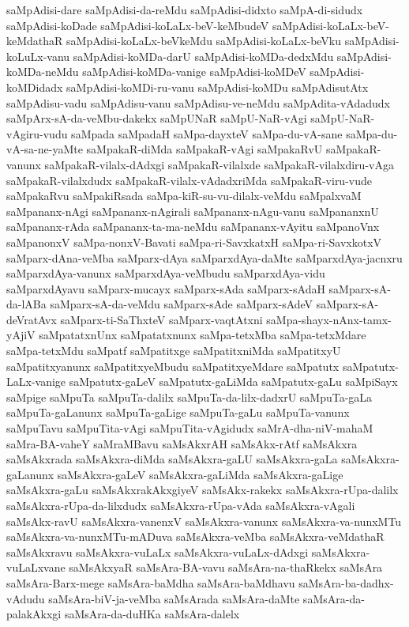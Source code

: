 {saMpAdisi-dare
saMpAdisi-da-reMdu
saMpAdisi-didxto
saMpA-di-sidudx
saMpAdisi-koDade
saMpAdisi-koLaLx-beV-keMbudeV
saMpAdisi-koLaLx-beV-keMdathaR
saMpAdisi-koLaLx-beVkeMdu
saMpAdisi-koLaLx-beVku
saMpAdisi-koLuLx-vanu
saMpAdisi-koMDa-darU
saMpAdisi-koMDa-dedxMdu
saMpAdisi-koMDa-neMdu
saMpAdisi-koMDa-vanige
saMpAdisi-koMDeV
saMpAdisi-koMDidadx
saMpAdisi-koMDi-ru-vanu
saMpAdisi-koMDu
saMpAdisutAtx
saMpAdisu-vadu
saMpAdisu-vanu
saMpAdisu-ve-neMdu
saMpAdita-vAdadudx
saMpArx-sA-da-veMbu-dakekx
saMpUNaR
saMpU-NaR-vAgi
saMpU-NaR-vAgiru-vudu
saMpada
saMpadaH
saMpa-dayxteV
saMpa-du-vA-sane
saMpa-du-vA-sa-ne-yaMte
saMpakaR-diMda
saMpakaR-vAgi
saMpakaRvU
saMpakaR-vanunx
saMpakaR-vilalx-dAdxgi
saMpakaR-vilalxde
saMpakaR-vilalxdiru-vAga
saMpakaR-vilalxdudx
saMpakaR-vilalx-vAdadxriMda
saMpakaR-viru-vude
saMpakaRvu
saMpakiRsada
saMpa-kiR-su-vu-dilalx-veMdu
saMpalxvaM
saMpananx-nAgi
saMpananx-nAgirali
saMpananx-nAgu-vanu
saMpananxnU
saMpananx-rAda
saMpananx-ta-ma-neMdu
saMpananx-vAyitu
saMpanoVnx
saMpanonxV
saMpa-nonxV-Bavati
saMpa-ri-SavxkatxH
saMpa-ri-SavxkotxV
saMparx-dAna-veMba
saMparx-dAya
saMparxdAya-daMte
saMparxdAya-jacnxru
saMparxdAya-vanunx
saMparxdAya-veMbudu
saMparxdAya-vidu
saMparxdAyavu
saMparx-mucayx
saMparx-sAda
saMparx-sAdaH
saMparx-sA-da-lABa
saMparx-sA-da-veMdu
saMparx-sAde
saMparx-sAdeV
saMparx-sA-deVratAvx
saMparx-ti-SaThxteV
saMparx-vaqtAtxni
saMpa-shayx-nAnx-tamx-yAjiV
saMpatatxnUnx
saMpatatxnunx
saMpa-tetxMba
saMpa-tetxMdare
saMpa-tetxMdu
saMpatf
saMpatitxge
saMpatitxniMda
saMpatitxyU
saMpatitxyanunx
saMpatitxyeMbudu
saMpatitxyeMdare
saMpatutx
saMpatutx-LaLx-vanige
saMpatutx-gaLeV
saMpatutx-gaLiMda
saMpatutx-gaLu
saMpiSayx
saMpige
saMpuTa
saMpuTa-dalilx
saMpuTa-da-lilx-dadxrU
saMpuTa-gaLa
saMpuTa-gaLanunx
saMpuTa-gaLige
saMpuTa-gaLu
saMpuTa-vanunx
saMpuTavu
saMpuTita-vAgi
saMpuTita-vAgidudx
saMrA-dha-niV-mahaM
saMra-BA-vaheY
saMraMBavu
saMsAkxrAH
saMsAkx-rAtf
saMsAkxra
saMsAkxrada
saMsAkxra-diMda
saMsAkxra-gaLU
saMsAkxra-gaLa
saMsAkxra-gaLanunx
saMsAkxra-gaLeV
saMsAkxra-gaLiMda
saMsAkxra-gaLige
saMsAkxra-gaLu
saMsAkxrakAkxgiyeV
saMsAkx-rakekx
saMsAkxra-rUpa-dalilx
saMsAkxra-rUpa-da-lilxdudx
saMsAkxra-rUpa-vAda
saMsAkxra-vAgali
saMsAkx-ravU
saMsAkxra-vanenxV
saMsAkxra-vanunx
saMsAkxra-va-nunxMTu
saMsAkxra-va-nunxMTu-mADuva
saMsAkxra-veMba
saMsAkxra-veMdathaR
saMsAkxravu
saMsAkxra-vuLaLx
saMsAkxra-vuLaLx-dAdxgi
saMsAkxra-vuLaLxvane
saMsAkxyaR
saMsAra-BA-vavu
saMsAra-na-thaRkekx
saMsAra
saMsAra-Barx-mege
saMsAra-baMdha
saMsAra-baMdhavu
saMsAra-ba-dadhx-vAdudu
saMsAra-biV-ja-veMba
saMsArada
saMsAra-daMte
saMsAra-da-palakAkxgi
saMsAra-da-duHKa
saMsAra-dalelx
}
